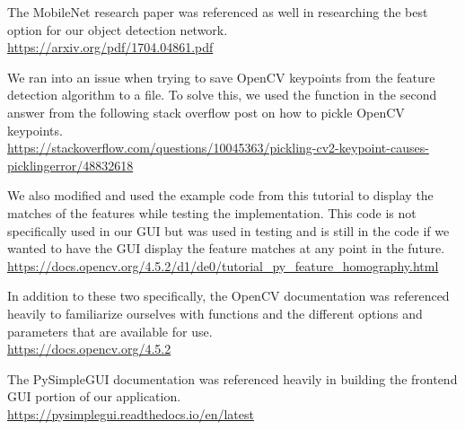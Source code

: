 \documentclass[12pt]{article}
\begin{document}
	The MobileNet research paper was referenced as well in researching the best option for our object detection network. \\ \url{https://arxiv.org/pdf/1704.04861.pdf}
	
	We ran into an issue when trying to save OpenCV keypoints from the feature detection algorithm to a file. To solve this, we used the function in the second answer from the following stack overflow post on how to pickle OpenCV keypoints. \\ \url{https://stackoverflow.com/questions/10045363/pickling-cv2-keypoint-causes-picklingerror/48832618}
	
	
	We also modified and used the example code from this tutorial to display the matches of the features while testing the implementation. This code is not specifically used in our GUI but was used in testing and is still in the code if we wanted to have the GUI display the feature matches at any point in the future. \\
	\url{https://docs.opencv.org/4.5.2/d1/de0/tutorial_py_feature_homography.html}
	
	In addition to these two specifically, the OpenCV documentation was referenced heavily to familiarize ourselves with functions and the different options and parameters that are available for use. \\
	\url{https://docs.opencv.org/4.5.2}
	
	The PySimpleGUI documentation was referenced heavily in building the frontend GUI portion of our application. \\ \url{https://pysimplegui.readthedocs.io/en/latest}
\end{document}
